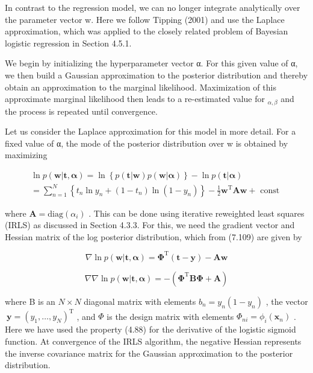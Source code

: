 \documentclass[
  10
]{article}
\begin{document}
In contrast to the regression model, we can no longer integrate
analytically over the parameter vector w. Here we follow Tipping (2001)
and use the Laplace approximation, which was applied to the closely
related problem of Bayesian logistic regression in Section 4.5.1.

We begin by initializing the hyperparameter vector α. For this given
value of α, we then build a Gaussian approximation to the posterior
distribution and thereby obtain an approximation to the marginal
likelihood. Maximization of this approximate marginal likelihood then
leads to a re-estimated value for \(_ { \alpha , \beta }\) and the
process is repeated until convergence.

Let us consider the Laplace approximation for this model in more detail.
For a fixed value of α, the mode of the posterior distribution over w is
obtained by maximizing

\[
\begin{array}{l} \ln p (\mathbf {w} | \mathbf {t}, \boldsymbol {\alpha}) = \ln \left\{p (\mathbf {t} | \mathbf {w}) p (\mathbf {w} | \boldsymbol {\alpha}) \right\} - \ln p (\mathbf {t} | \boldsymbol {\alpha}) \\ = \sum_ {n = 1} ^ {N} \left\{t _ {n} \ln y _ {n} + (1 - t _ {n}) \ln (1 - y _ {n}) \right\} - \frac {1}{2} \mathbf {w} ^ {\mathrm{T}} \mathbf {A} \mathbf {w} + \text { const } \end{array}\tag{7.109}
\]

where \(\mathbf { A } = \mathrm { d i a g } ( \alpha _ { i } )\) . This
can be done using iterative reweighted least squares (IRLS) as discussed
in Section 4.3.3. For this, we need the gradient vector and Hessian
matrix of the log posterior distribution, which from (7.109) are given
by

\[
\nabla \ln p (\mathbf {w} | \mathbf {t}, \boldsymbol {\alpha}) = \boldsymbol {\Phi} ^ {\mathrm{T}} (\mathbf {t} - \mathbf {y}) - \mathbf {A w}\tag{7.110}
\]

\[
\nabla \nabla \ln p (\mathbf {w} | \mathbf {t}, \boldsymbol {\alpha}) = - \left(\boldsymbol {\Phi} ^ {\mathrm{T}} \mathbf {B} \boldsymbol {\Phi} + \mathbf {A}\right)\tag{7.111}
\]

where B is an \(N \times N\) diagonal matrix with elements
\(b _ { n } = y _ { n } ( 1 - y _ { n } )\) , the vector
\(\pmb { \ y } = ( y _ { 1 } , \dots , y _ { N } ) ^ { \mathrm { T } }\)
, and \(\Phi\) is the design matrix with elements
\(\Phi _ { n i } = \phi _ { i } ( \mathbf { x } _ { n } )\) . Here we
have used the property (4.88) for the derivative of the logistic sigmoid
function. At convergence of the IRLS algorithm, the negative Hessian
represents the inverse covariance matrix for the Gaussian approximation
to the posterior distribution.
\end{document}
